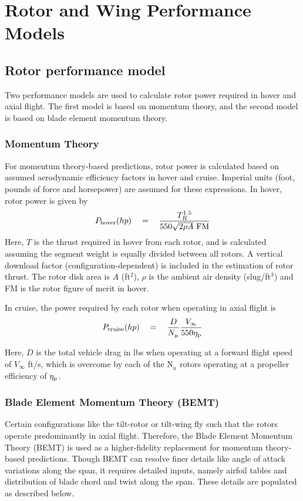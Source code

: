 \section{Rotor and Wing Performance Models}

\subsection{Rotor performance model}

Two performance models are used to calculate rotor power required in hover and axial flight. The first model is based on momentum theory, and the second model is based on blade element momentum theory. 

\subsubsection{Momentum Theory}
For momentum theory-based predictions, rotor power is calculated based on assumed aerodynamic efficiency factors in hover and cruise. Imperial units (foot, pounds of force and horsepower) are assumed for these expressions. In hover, rotor power is given by 
\begin{equation}
P_{\rm hover} (hp) \quad = \quad \frac{T_R^{1.5}}{550 \sqrt{2 \rho A} \textrm{ FM}}
\end{equation}
Here, $T$ is the thrust required in hover from each rotor, and is calculated assuming the segment weight is equally divided between all rotors. A vertical download factor (configuration-dependent) is included in the estimation of rotor thrust. The rotor disk area is $A$ (ft$^2$), $\rho$ is the ambient air density (slug/ft$^3$) and FM is the rotor figure of merit in hover. 

In cruise, the power required by each rotor when operating in axial flight is 
\begin{equation}
P_{\rm cruise} (hp) \quad = \quad \frac{D}{N_{_\textrm{R}} } \frac{V_{\infty}}{550 \eta_{\rm p}}
\end{equation}

Here, $D$ is the total vehicle drag in lbs when operating at a forward flight speed of $V_{\infty}$ ft/s, which is overcome by each of the N$_{_\textrm{R}}$ rotors operating at a propeller efficiency of $\eta_{\rm p}$. 


\subsubsection{Blade Element Momentum Theory (BEMT)}
Certain configurations like the tilt-rotor or tilt-wing fly such that the rotors operate predominantly in axial flight. Therefore, the Blade Element Momentum Theory (BEMT) is used as a higher-fidelity replacement for momentum theory-based predictions. Though BEMT can resolve finer details like angle of attack variations along the span, it requires detailed inputs, namely airfoil tables and distribution of blade chord and twist along the span. These details are populated as described below.

